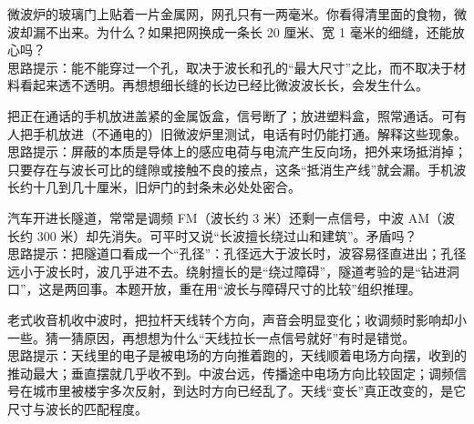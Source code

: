 \begin{puzzles}
\item 微波炉的玻璃门上贴着一片金属网，网孔只有一两毫米。你看得清里面的食物，微波却漏不出来。为什么？如果把网换成一条长 20 厘米、宽 1 毫米的细缝，还能放心吗？\\
思路提示：能不能穿过一个孔，取决于波长和孔的“最大尺寸”之比，而不取决于材料看起来透不透明。再想想细长缝的长边已经比微波波长长，会发生什么。

\item 把正在通话的手机放进盖紧的金属饭盒，信号断了；放进塑料盒，照常通话。可有人把手机放进（不通电的）旧微波炉里测试，电话有时仍能打通。解释这些现象。\\
思路提示：屏蔽的本质是导体上的感应电荷与电流产生反向场，把外来场抵消掉；只要存在与波长可比的缝隙或接触不良的接点，这条“抵消生产线”就会漏。手机波长约十几到几十厘米，旧炉门的封条未必处处密合。

\item 汽车开进长隧道，常常是调频 FM（波长约 3 米）还剩一点信号，中波 AM（波长约 300 米）却先消失。可平时又说“长波擅长绕过山和建筑”。矛盾吗？\\
思路提示：把隧道口看成一个“孔径”：孔径远大于波长时，波容易径直进出；孔径远小于波长时，波几乎进不去。绕射擅长的是“绕过障碍”，隧道考验的是“钻进洞口”，这是两回事。本题开放，重在用“波长与障碍尺寸的比较”组织推理。

\item 老式收音机收中波时，把拉杆天线转个方向，声音会明显变化；收调频时影响却小一些。猜一猜原因，再想想为什么“天线拉长一点信号就好”有时是错觉。\\
思路提示：天线里的电子是被电场的方向推着跑的，天线顺着电场方向摆，收到的推动最大；垂直摆就几乎收不到。中波台远，传播途中电场方向比较固定；调频信号在城市里被楼宇多次反射，到达时方向已经乱了。天线“变长”真正改变的，是它尺寸与波长的匹配程度。
\end{puzzles}
